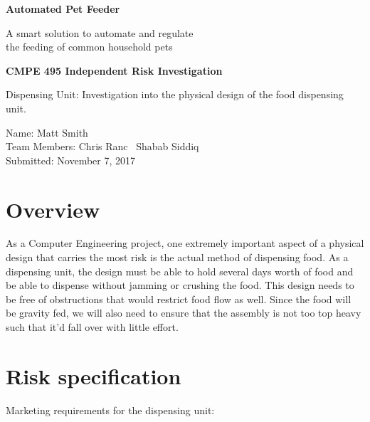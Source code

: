 \documentclass[12pt]{article}
\newcommand{\projectDescription}{A smart solution to automate and regulate \\the feeding of common household pets}
\newcommand{\projectTitle}{Automated Pet Feeder}
\newcommand{\yourname}{Matt Smith}
\newcommand{\myname}{Chris Ranc}
\newcommand{\anothername}{Shabab Siddiq}
\newcommand{\dateSubmitted}{November 7, 2017}
\newcommand{\componentDescription}{Dispensing Unit: Investigation into the physical design of the food dispensing unit.}
\begin{document}
    
\thispagestyle{empty}
    \vspace*{2.5cm} 
    \begin{center}
        \LARGE
        \textbf{\projectTitle}

        \Large
        \projectDescription

    \vspace*{2.5cm} 
        \large
        \textbf{CMPE 495 Independent Risk Investigation}

        \componentDescription
    \end{center}
    
    \vspace*{2cm}
    
    \begin{multicols}{2}
        \phantom{LaTeX doesn't like empty columns} %
        \columnbreak{}
        \begin{raggedright}
            
        Name: \yourname\\
        Team Members: \myname\
        \phantom{Team Members:} \anothername\\
        Submitted: \dateSubmitted\\
        \vspace{\baselineskip}
        \end{raggedright}
    \end{multicols}
\newpage
%
%
\renewcommand{\cftaftertoctitle}{\thispagestyle{empty}} 
\renewcommand\cftsecleader{\cftdotfill{\cftdotsep}}
\tableofcontents
\newpage

\section{Overview}
As a Computer Engineering project, one extremely important aspect of a physical design that carries the most risk is the actual method of dispensing food. As a dispensing unit, the design must be able to hold several days worth of food and be able to dispense without jamming or crushing the food. This design needs to be free of obstructions that would restrict food flow as well. Since the food will be gravity fed, we will also need to ensure that the assembly is not too top heavy such that it’d fall over with little effort.  
 
\section{Risk specification}
Marketing requirements for the dispensing unit:
\end{document}
